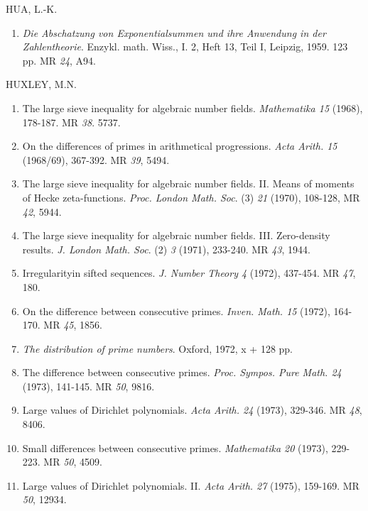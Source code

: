 \begin{thebibliography}{99}
 HUA, L.-K.
\begin{enumerate}
\item \textit{Die Abschatzung von Exponentialsummen und ihre
  Anwendung in der Zahlentheorie}. Enzykl. math. Wiss., I. 2, Heft 13,
  Teil I, Leipzig, 1959. 123 pp. MR {\em 24}, A94. 
\end{enumerate}

 HUXLEY, M.N.
\begin{enumerate}
\item The large sieve inequality for algebraic number
  fields. \textit{Mathematika 15} (1968), 178-187. MR {\em 38}. 5737.

\item On the differences of primes in arithmetical
  progressions. \textit{Acta
    Arith. 15} (1968/69), 367-392. MR {\em 39}, 5494. 

\item The large sieve inequality for algebraic number
  fields. II. Means of moments of Hecke
  zeta-functions. \textit{Proc. London
    Math. Soc}. (3) {\em 21} (1970), 108-128, MR {\em 42}, 5944. 

\item The large sieve inequality for algebraic number
  fields. III. Zero-density results. \textit{J. London
    Math. Soc}. (2) {\em 3} (1971), 233-240. MR {\em 43}, 1944. 

\item Irregularity\pageoriginale in sifted
  sequences. \textit{J. Number Theory 4} (1972), 437-454. MR {\em 47},
  180. 

\item On the difference between consecutive
  primes. \textit{Inven. Math. 15} (1972), 164-170. MR {\em 45}, 1856.

\item \textit{The distribution of prime numbers}. Oxford, 1972, x
  + 128 pp.

\item The difference between consecutive
  primes. \textit{Proc. Sympos. Pure
    Math. 24} (1973), 141-145. MR {\em 50}, 9816.

\item Large values of Dirichlet polynomials. \textit{Acta
  Arith. 24} (1973), 329-346. MR {\em 48}, 8406.

\item Small differences between consecutive
  primes. \textit{Mathematika 20} (1973), 229-223. MR {\em 50}, 4509.

\item Large values of Dirichlet polynomials. II. \textit{Acta
  Arith. 27} (1975), 159-169. MR {\em 50}, 12934.


\end{enumerate}
\end{thebibliography}
